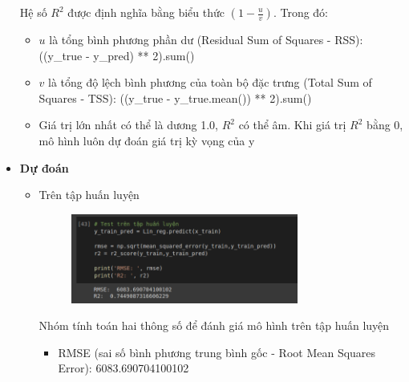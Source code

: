 \documentclass{article}
\begin{document}
\begin{itemize}
		Hệ số $R^2$ được định nghĩa bằng biểu thức $\left(1 - \frac{u}{v}\right)$. Trong đó:
		\begin{itemize}
			\item $u$ là tổng bình phương phần dư (Residual Sum of Squares - RSS):((y\_true - y\_pred) ** 2).sum()
			\item $v$ là tổng độ lệch bình phương của toàn bộ đặc trưng (Total Sum of Squares - TSS): ((y\_true - y\_true.mean()) ** 2).sum()
			\item Giá trị lớn nhất có thể là dương 1.0, $R^2$ có thể âm. Khi giá trị $R^2$ bằng 0, mô hình luôn dự đoán giá trị kỳ vọng của y
		\end{itemize}
		\item \textbf{Dự đoán}
		\begin{itemize}
			\item Trên tập huấn luyện
			\begin{figure}[H]
				\centering
				\includegraphics[width=0.75\textwidth]{images/linear_reg/linear_reg_predict_train.png}
			\end{figure}
			Nhóm tính toán hai thông số để đánh giá mô hình trên tập huấn luyện
			\begin{itemize}
				\item RMSE (sai số bình phương trung bình gốc - Root Mean Squares Error): 6083.690704100102
						

\end{itemize}
\end{itemize}
\end{itemize}
\end{document}
